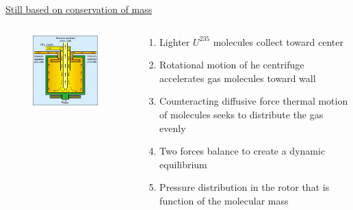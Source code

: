 \documentclass[aspectratio=1610,pdftex,dvipsnames,compress,xcolor={dvipsnames}]{beamer}
\begin{document}
\begin{frame}{\href{https://uidaho.pressbooks.pub/nuclearengineering/chapter/front-end-of-the-fuel-cycle/}{Still based on conservation of mass}}
    \begin{columns}[t]

        \begin{column}{0.35\textwidth}
            \begin{figure}
                \centering
                \includegraphics[width=0.95\textwidth]{gas.centrifuge.jpg}
            \end{figure}
        \end{column}

        \begin{column}{0.65\textwidth}
            \begin{enumerate}[series=outerlist,topsep=0pt,itemsep=7pt,leftmargin=*,label=(\arabic*)]
                \item[]Lighter $U^{235}$ molecules collect toward center
                \item[]Rotational motion of he centrifuge accelerates gas molecules toward  wall
                \item[]Counteracting diffusive force thermal motion of molecules seeks to distribute the gas evenly
                \item[]Two forces balance to create a dynamic equilibrium
                \item[]Pressure distribution in the rotor that is function of the molecular mass
            \end{enumerate}
            

\end{column}
\end{columns}
\end{frame}
\end{document}
